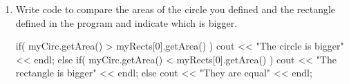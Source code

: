 \begin{enumerate}
      \item Write code to compare the areas of the circle you defined and the rectangle
        defined in the program and indicate which is bigger.
        \begin{answer}[1.25in]
          \begin{center}
            \small
            \begin{minipage}{4in}
              \begin{cpplst}
if( myCirc.getArea() > myRects[0].getArea() ) {
  cout << "The circle is bigger" << endl;
} else if( myCirc.getArea() < myRects[0].getArea() ) {
  cout << "The rectangle is bigger" << endl;
} else {
  cout << "They are equal" << endl;
}
              \end{cpplst}
            \end{minipage}
          \end{center}
        \end{answer}
      \end{enumerate}